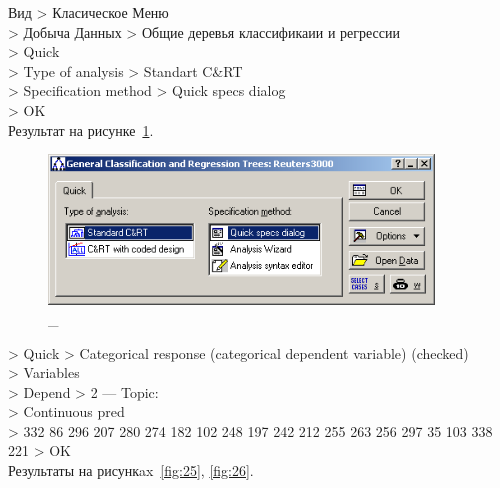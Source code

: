 Вид > Класическое Меню \\
> Добыча Данных > Общие деревья классификаии и регрессии \\
> Quick \\
> Type of analysis > Standart C\&RT \\
> Specification method > Quick specs dialog \\
> OK \\

Результат на рисунке~\ref{fig:24}.

\begin{figure}[!h]
  \centering

  \includegraphics[height=4cm]
  {inc/24.PNG}

  \caption{\_}

  \label{fig:24}
\end{figure}

\newpage

> Quick > Categorical response (categorical dependent variable) (checked) \\
> Variables \\
> Depend > 2 — Topic: \\
> Continuous pred\\
> 332 86 296 207 280 274 182 102 248 197 242 212 255 263 256 297 35 103 338 221 > OK\\

Результаты на рисункax~\ref{fig:25}, \ref{fig:26}.

